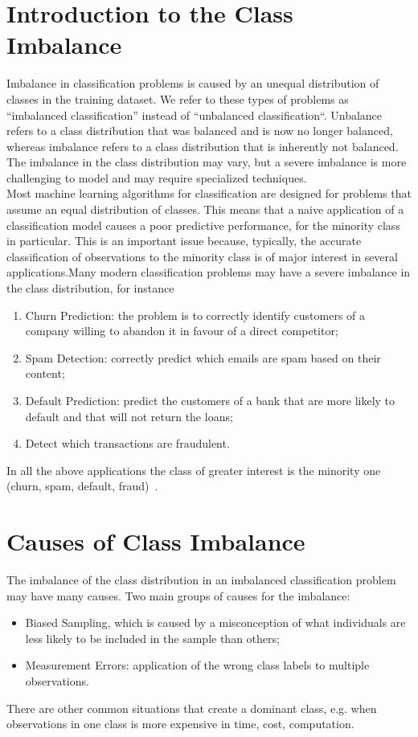 \section{Introduction to the  Class Imbalance }
Imbalance in  classification problems is caused by an unequal distribution of classes in the training dataset. We refer to these types of problems as “imbalanced classification” instead of “unbalanced classification“. Unbalance refers to a class distribution that was balanced and is now no longer balanced, whereas imbalance refers to a class distribution that is inherently not balanced. The imbalance in the class distribution may vary, but a severe imbalance is more challenging to model and may require specialized techniques.  \\
Most machine learning algorithms for classification  are designed for problems that assume an equal distribution of classes. 
This means that a naive application of a classification model causes a poor predictive performance, for the minority class in particular. This is an important issue because, typically, the accurate classification of observations to the minority class is of major interest in several applications.Many modern classification problems may have a severe imbalance in the class distribution, for instance
\begin{enumerate}
    \item {Churn Prediction: the problem is to correctly identify customers of a company willing to abandon it in favour of  a direct competitor;}
    \item {Spam Detection: correctly predict which emails are  spam  based on their content;}
    \item {Default Prediction: predict the customers of a bank that are more likely to default and that will not return the loans;}
    \item{Detect which transactions are fraudulent.} 
\end{enumerate}
\noindent
In all the above applications the class of greater interest is the minority one (churn, spam, default, fraud)~\cite{gui2017analysis}.



\section{Causes of  Class Imbalance }
The imbalance of the class distribution in an imbalanced classification  problem may have many causes.
Two main groups of causes for the imbalance:
 \begin{itemize}
     \item{Biased Sampling, which is caused by a misconception of what individuals are less likely to be included in the sample than others;}
     \item{Measurement Errors: application of the wrong class labels to multiple observations.}
 \end{itemize}
\noindent
There are other common situations that create a dominant class, e.g. when observations in one class is more expensive in time, cost, computation.

